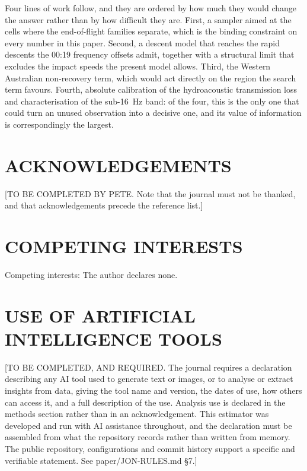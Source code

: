 \documentclass[12pt,a4paper]{article}
\begin{document}
Four lines of work follow, and they are ordered by how much they would change the answer rather
than by how difficult they are. First, a sampler aimed at the cells where the end-of-flight
families separate, which is the binding constraint on every number in this paper. Second, a
descent model that reaches the rapid descents the 00:19 frequency offsets admit, together with a
structural limit that excludes the impact speeds the present model allows. Third, the Western
Australian non-recovery term, which would act directly on the region the search term favours.
Fourth, absolute calibration of the hydroacoustic transmission loss and characterisation of the
sub-16~Hz band: of the four, this is the only one that could turn an unused observation into a
decisive one, and its value of information is correspondingly the largest.

\section*{ACKNOWLEDGEMENTS}

[TO BE COMPLETED BY PETE. Note that the journal must not be thanked, and that
acknowledgements precede the reference list.]

\section*{COMPETING INTERESTS}
Competing interests: The author declares none.

\section*{USE OF ARTIFICIAL INTELLIGENCE TOOLS}
[TO BE COMPLETED, AND REQUIRED. The journal requires a declaration describing any AI tool used
to generate text or images, or to analyse or extract insights from data, giving the tool name and
version, the dates of use, how others can access it, and a full description of the use. Analysis
use is declared in the methods section rather than in an acknowledgement. This estimator was
developed and run with AI assistance throughout, and the declaration must be assembled from what
the repository records rather than written from memory. The public repository, configurations and
commit history support a specific and verifiable statement. See paper/JON-RULES.md \S7.]
\end{document}

